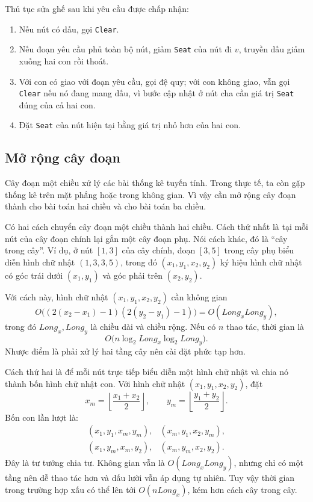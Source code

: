 \documentclass[11pt]{article}
\begin{document}
Thủ tục sửa ghế sau khi yêu cầu được chấp nhận:
\begin{enumerate}
  \item Nếu nút có dấu, gọi \texttt{Clear}.
  \item Nếu đoạn yêu cầu phủ toàn bộ nút, giảm \texttt{Seat} của nút đi $v$,
  truyền dấu giảm xuống hai con rồi thoát.
  \item Với con có giao với đoạn yêu cầu, gọi đệ quy; với con không giao,
  vẫn gọi \texttt{Clear} nếu nó đang mang dấu, vì bước cập nhật ở nút cha cần
  giá trị \texttt{Seat} đúng của cả hai con.
  \item Đặt \texttt{Seat} của nút hiện tại bằng giá trị nhỏ hơn của hai con.
\end{enumerate}

\subsection{Mở rộng cây đoạn}

Cây đoạn một chiều xử lý các bài thống kê tuyến tính. Trong thực tế, ta còn
gặp thống kê trên mặt phẳng hoặc trong không gian. Vì vậy cần mở rộng cây
đoạn thành  cho bài toán hai chiều và
 cho bài toán ba chiều.

Có hai cách chuyển cây đoạn một chiều thành hai chiều. Cách thứ nhất là tại
mỗi nút của cây đoạn chính lại gắn một cây đoạn phụ. Nói cách khác, đó là
``cây trong cây''. Ví dụ, ở nút $[1,3]$ của cây chính, đoạn $[3,5]$ trong cây
phụ biểu diễn hình chữ nhật $(1,3,3,5)$, trong đó $(x_1,y_1,x_2,y_2)$ ký hiệu
hình chữ nhật có góc trái dưới $(x_1,y_1)$ và góc phải trên $(x_2,y_2)$.

Với cách này, hình chữ nhật $(x_1,y_1,x_2,y_2)$ cần không gian
\[
  O\bigl((2(x_2-x_1)-1)(2(y_2-y_1)-1)\bigr)
  =O(\textit{Long}_x\textit{Long}_y),
\]
trong đó $\textit{Long}_x,\textit{Long}_y$ là chiều dài và chiều rộng. Nếu có
$n$ thao tác, thời gian là
\[
  O\bigl(n\log_2\textit{Long}_x\log_2\textit{Long}_y\bigr).
\]
Nhược điểm là phải xử lý hai tầng cây nên cài đặt phức tạp hơn.

Cách thứ hai là để mỗi nút trực tiếp biểu diễn một hình chữ nhật và chia nó
thành bốn hình chữ nhật con. Với hình chữ nhật $(x_1,y_1,x_2,y_2)$, đặt
\[
  x_m=\left\lfloor\frac{x_1+x_2}{2}\right\rfloor,\qquad
  y_m=\left\lfloor\frac{y_1+y_2}{2}\right\rfloor.
\]
Bốn con lần lượt là:
\[
\begin{array}{ll}
(x_1,y_1,x_m,y_m), & (x_m,y_1,x_2,y_m),\\
(x_1,y_m,x_m,y_2), & (x_m,y_m,x_2,y_2).
\end{array}
\]
Đây là tư tưởng chia tư. Không gian vẫn là
$O(\textit{Long}_x\textit{Long}_y)$, nhưng chỉ có một tầng nên dễ thao tác
hơn và dấu lười vẫn áp dụng tự nhiên. Tuy vậy thời gian trong trường hợp xấu
có thể lên tới $O(n\textit{Long}_x)$, kém hơn cách cây trong cây.
\end{document}
